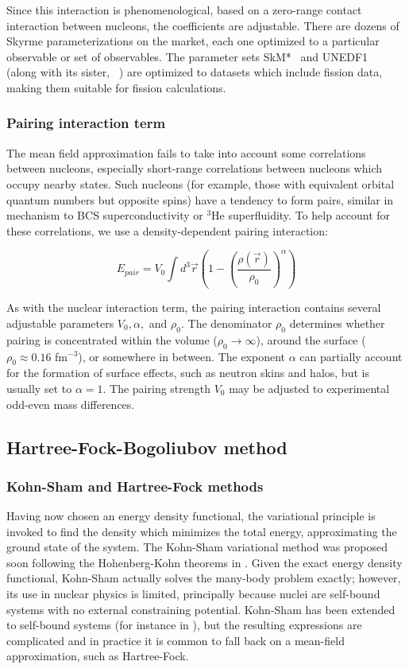 Since this interaction is phenomenological, based on a zero-range contact interaction between nucleons, the coefficients are adjustable. There are dozens of Skyrme parameterizations on the market, each one optimized to a particular observable or set of observables. The parameter sets SkM*~\cite{Bartel1982} and UNEDF1~\cite{Kortelainen2012} (along with its sister, {\hfb}~\cite{Schunck2015}) are optimized to datasets which include fission data, making them suitable for fission calculations.

\subsubsection{Pairing interaction term}
The mean field approximation fails to take into account some correlations between nucleons, especially short-range correlations between nucleons which occupy nearby states. Such nucleons (for example, those with equivalent orbital quantum numbers but opposite spins) have a tendency to form pairs, similar in mechanism to BCS superconductivity or $^3$He superfluidity. To help account for these correlations, we use a density-dependent pairing interaction:

\begin{equation}
E_{pair} = V_0 \int d^3\vec{r} \left( 1-\left(\frac{\rho(\vec{r})}{\rho_0}\right)^\alpha \right)
\end{equation}

\noindent As with the nuclear interaction term, the pairing interaction contains several adjustable parameters $V_0, \alpha,$ and $\rho_0$. The denominator $\rho_0$ determines whether pairing is concentrated within the volume ($\rho_0\rightarrow\infty$), around the surface ($\rho_0\approx0.16$ fm$^{-3}$), or somewhere in between. The exponent $\alpha$ can partially account for the formation of surface effects, such as neutron skins and halos, but is usually set to $\alpha=1$. The pairing strength $V_0$ may be adjusted to experimental odd-even mass differences.

\subsection{Hartree-Fock-Bogoliubov method}\label{sect:HFB}
\subsubsection{Kohn-Sham and Hartree-Fock methods}

Having now chosen an energy density functional, the variational principle is invoked to find the density which minimizes the total energy, approximating the ground state of the system. The Kohn-Sham variational method was proposed soon following the Hohenberg-Kohn theorems in \cite{kohn1965}. Given the exact energy density functional, Kohn-Sham actually solves the many-body problem exactly; however, its use in nuclear physics is limited, principally because nuclei are self-bound systems with no external constraining potential. Kohn-Sham has been extended to self-bound systems (for instance in \cite{engel2007}), but the resulting expressions are complicated and in practice it is common to fall back on a mean-field approximation, such as Hartree-Fock.

